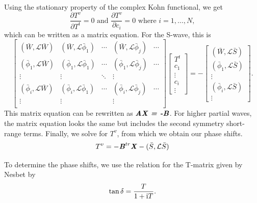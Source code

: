 \documentclass[preprint,showpacs,preprintnumbers,amsmath,amssymb]{revtex4}
\newcommand{\beq}{\begin{equation}}
\newcommand{\eeq}{\end{equation}}
\newcommand{\ii}{{\rm{i}}}
\begin{document}
Using the stationary property of the complex Kohn functional, we get
\beq
\frac{\partial T^v}{\partial T^t} = 0  \text{ and } \frac{\partial T^v}{\partial c_i} = 0 \text{ where $i = 1,\ldots,N$},
\label{eq:ComplexKohnStationary}
\eeq
which can be written as a matrix equation. For the S-wave, this is
\begin{equation}
\label{eq:ComplexKohnMatrix}
\begin{bmatrix} 
 (\bar{W},\mathcal{L}\bar{W}) & (\bar{W},\mathcal{L}\bar{\phi}_1) & \cdots & (\bar{W},\mathcal{L}\bar{\phi}_j) & \cdots\\
 (\bar{\phi}_1,\mathcal{L}\bar{W}) & (\bar{\phi}_1,\mathcal{L}\bar{\phi}_1) & \cdots & (\bar{\phi}_1,\mathcal{L}\bar{\phi}_j) & \cdots\\
 \vdots & \vdots & \ddots & \vdots \\
 (\bar{\phi}_i,\mathcal{L}\bar{W}) & (\bar{\phi}_i,\mathcal{L}\bar{\phi}_1) & \cdots & (\bar{\phi}_i,\mathcal{L}\bar{\phi}_j) & \cdots\\
 \vdots & \vdots & & \vdots & \\
\end{bmatrix}
\begin{bmatrix}
T^t\\
c_1\\
\vdots\\
c_i\\
\vdots
\end{bmatrix}
= -
\begin{bmatrix}
(\bar{W},\mathcal{L}\bar{S}) \\
(\bar{\phi}_1,\mathcal{L}\bar{S}) \\
\vdots \\
(\bar{\phi}_i,\mathcal{L}\bar{S}) \\
\vdots
\end{bmatrix}.
\end{equation}
This matrix equation can be rewritten as $\textbf{\emph{AX = -B}}$. For higher partial waves, the matrix equation looks the same but includes the second symmetry short-range terms. Finally, we solve for $T^v$, from which we obtain our phase shifts.
\begin{equation}
T^v = -\textbf{\emph{B}}^{tr} \textbf{\emph{X}} - (\bar{S},\mathcal{L} \bar{S})
\end{equation}

To determine the phase shifts, we use the relation for the T-matrix given by Nesbet \cite{Nesbet2003} by
\begin{equation}
\tan \delta = \frac{T}{1 + \ii T}.
\end{equation}
\end{document}
